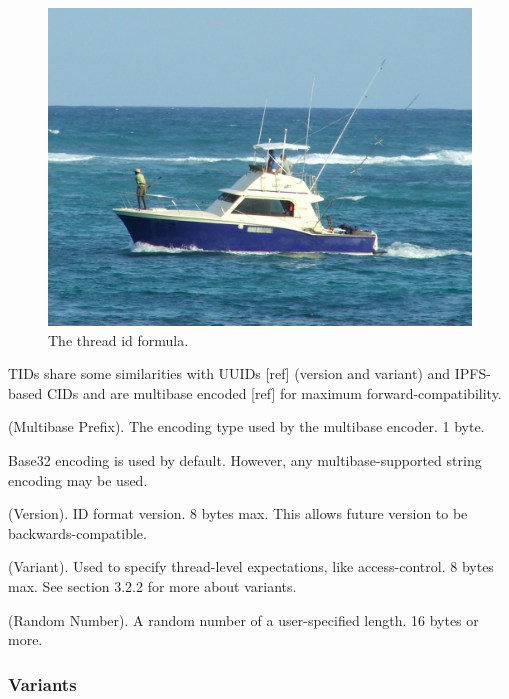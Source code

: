 \documentclass{comjnl}
\begin{document}
\begin{figure}
  \includegraphics[width=\linewidth]{boat.jpg}
  \caption{The thread id formula.}
  \label{fig:boat1}
\end{figure}

TIDs share some similarities with UUIDs [ref] (version and variant) and IPFS-based CIDs and are multibase encoded [ref] for maximum forward-compatibility.

\begin{definition}
(Multibase Prefix). The encoding type used by the multibase encoder. 1 byte.
\end{definition}

Base32 encoding is used by default. However, any multibase-supported string encoding may be used.

\begin{definition}
(Version). ID format version. 8 bytes max. This allows future version to be backwards-compatible.
\end{definition}

\begin{definition}
(Variant). Used to specify thread-level expectations, like access-control. 8 bytes max. See section 3.2.2 for more about variants.
\end{definition}

\begin{definition}
(Random Number). A random number of a user-specified length. 16 bytes or more.
\end{definition}

\subsubsection{Variants}
\end{document}
